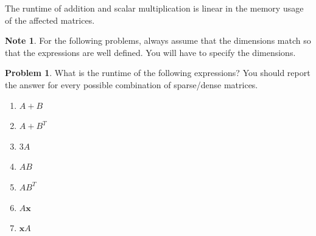 \documentclass[10pt]{article}
\theoremstyle{definition}
\newtheorem{problem}{Problem}
\newtheorem{note}{Note}
\newcommand{\trans}[1]{{#1}^{T}}
\newcommand{\x}{\mathbf x}
\begin{document}
The runtime of addition and scalar multiplication is linear in the memory usage of the affected matrices.

\begin{note}
For the following problems, always assume that the dimensions match so that the expressions are well defined.
You will have to specify the dimensions.
\end{note}

\begin{problem}
    What is the runtime of the following expressions?
    You should report the answer for every possible combination of sparse/dense matrices.

    \begin{enumerate}
        \item
            $A + B$
            \vspace{1.5in}
        \item
            $A + \trans B$
            \vspace{1.5in}
        \item
            $3A$
            \vspace{1.5in}
        \item
            $AB$
            \vspace{1.5in}
        \item
            $A\trans B$
            \vspace{1.5in}
        \item
            $A\x$
            \vspace{1.5in}
        \item
            $\x A$
            \vspace{1.5in}
    \end{enumerate}
\end{problem}

\end{document}
